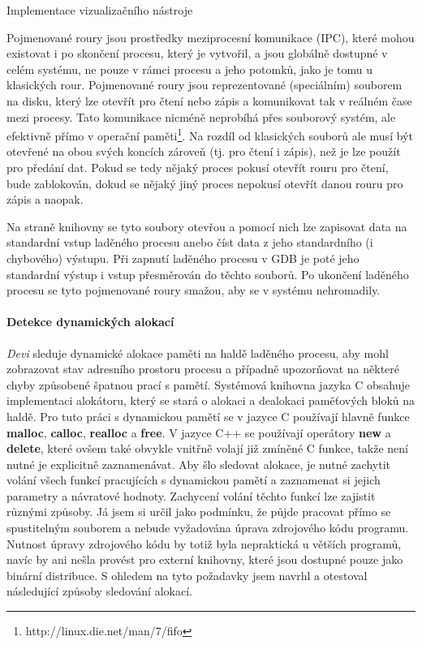 \documentclass[czech,bachelor,male,python,dept460,hidelinks]{diploma}						%
\newcommand{\parspace}[1][]{
	\ifthenelse{\isempty{#1}}{\vspace{5mm}}{\vspace{#1}}
	\par
}
\begin{document}
\begin{section}{Implementace vizualizačního nástroje}
			\parspace Pojmenované roury jsou prostředky meziprocesní komunikace (IPC), které mohou existovat i po skončení procesu, který je vytvořil, a jsou globálně
			dostupné v celém systému, ne pouze v rámci procesu a jeho potomků, jako je tomu u klasických rour. Pojmenované roury jsou reprezentované (speciálním)
			souborem na disku, který lze otevřít pro čtení nebo zápis a komunikovat tak v reálném čase mezi procesy. Tato komunikace nicméně neprobíhá 
			přes souborový systém, ale efektivně přímo v operační paměti\footnote{http://linux.die.net/man/7/fifo}.
			Na rozdíl od klasických souborů ale musí být otevřené na obou svých koncích zároveň (tj. pro čtení i zápis), než je lze použít pro předání dat.
			Pokud se tedy nějaký proces pokusí otevřít rouru pro čtení, bude zablokován, dokud se nějaký jiný proces nepokusí otevřít danou
			rouru pro zápis a naopak.
			
			
			\parspace Na straně knihovny se tyto soubory otevřou a pomocí nich lze zapisovat data na standardní vstup laděného procesu anebo číst data z jeho
			standardního (i chybového) výstupu. Při zapnutí laděného procesu v GDB je poté jeho standardní výstup i vstup přesměrován do těchto souborů.
			Po ukončení laděného procesu se tyto pojmenované roury smažou, aby se v systému nehromadily.
			
			
		\paragraph*{Detekce dynamických alokací}
			\textit{Devi} sleduje dynamické alokace paměti na haldě laděného procesu, aby mohl zobrazovat stav adresního prostoru procesu a případně upozorňovat na
			některé chyby způsobené špatnou prací s pamětí. Systémová knihovna jazyka C obsahuje implementaci alokátoru, který se stará o alokaci a dealokaci paměťových
			bloků na haldě. Pro tuto práci s dynamickou pamětí se v jazyce C používají hlavně funkce \textbf{malloc}, \textbf{calloc}, \textbf{realloc}
			a \textbf{free}. V jazyce C++ se používají operátory \textbf{new} a \textbf{delete}, které ovšem také obvykle vnitřně volají již zmíněné C funkce,
			takže není nutné je explicitně zaznamenávat. Aby šlo sledovat alokace, je nutné zachytit volání všech funkcí pracujících s dynamickou pamětí a zaznamenat si
			jejich parametry a návratové hodnoty. Zachycení volání těchto funkcí lze zajistit různými způsoby. Já jsem si určil jako podmínku, že půjde pracovat
			přímo se spustitelným souborem a nebude vyžadována úprava zdrojového kódu programu.
			Nutnost úpravy zdrojového kódu by totiž byla nepraktická u větších programů, navíc by ani nešla provést pro externí knihovny, které jsou dostupné pouze
			jako binární distribuce.
			S ohledem na tyto požadavky jsem navrhl a otestoval následující způsoby sledování alokací.

\end{section}
\end{document}
